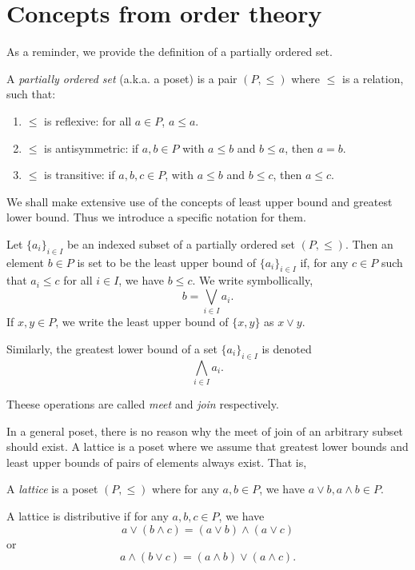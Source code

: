 \documentclass{owmaths}
\begin{document}
\section{Concepts from order theory}
As a reminder, we provide the definition of a partially ordered set.
\begin{definition}
    A \emph{partially ordered set} (a.k.a. a poset) is a pair $(P,\leq)$
    where $\leq$ is a relation, such that: 
    \begin{enumerate}
        \item{} $\leq$ is reflexive: for all $a \in P$, $a \leq a$.
        \item{} $\leq$ is antisymmetric: if $a,b \in P$ with $a\leq b$ and $b\leq a$, then $a = b$.
        \item{} $\leq$ is transitive: if $a,b,c \in P$, with $a \leq b$ and $b\leq c$, then $a\leq c$.
    \end{enumerate}
\end{definition}
We shall make extensive use of the concepts of least upper bound
and greatest lower bound. Thus we introduce a specific notation for them.
\begin{definition}
    Let $\{a_i\}_{i \in I}$ be an indexed subset of a partially ordered set $(P,\leq)$. Then
    an element $b \in P$ is set to be the least upper bound of $\{a_i\}_{i \in I}$ if,
    for any $c \in P$ such that $a_i \leq c$ for all $i \in I$, we have $b \leq c$.
    We write symbollically,
    \begin{equation*}
        b = \bigvee_{i \in I} a_i.
    \end{equation*}
    If $x,y \in P$, we write the least upper bound of $\{x,y\}$ as $x \vee y$.
    
    Similarly, the greatest lower bound of a set $\{a_i\}_{i \in I}$ is denoted
    \begin{equation*}
        \bigwedge_{i \in I} a_i.
    \end{equation*}
    
    Theese operations are called \emph{meet} and \emph{join} respectively.
\end{definition}
In a general poset, there is no reason why the meet of
join of an arbitrary subset should exist. A lattice
is a poset where we assume that greatest lower bounds
and least upper bounds of pairs of elements always exist. That is,
\begin{definition}
    A \emph{lattice} is a poset $(P,\leq)$ where for any $a,b \in P$,
    we have $a\vee b,a\wedge b \in P$.
    
    A lattice is distributive if for any $a,b,c \in P$, we have
    \begin{equation*}
        a \vee (b \wedge c) = (a\vee b)\wedge (a\vee c)
    \end{equation*}
    or
    \begin{equation*}
        a \wedge (b \vee c) = (a \wedge b) \vee (a \wedge c).
    \end{equation*}
\end{definition}
\end{document}
